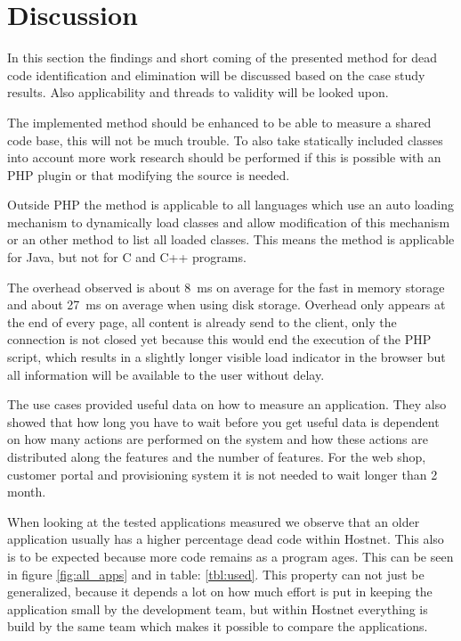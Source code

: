 \section{Discussion}
In this section the findings and short coming of the presented method for dead code identification and elimination will be discussed based on the case study results. Also applicability and threads to validity will be looked upon.

The implemented method should be enhanced to be able to measure a shared code base, this will not be much trouble. To also take statically included classes into account more work research should be performed if this is possible with an PHP plugin or that modifying the source is needed.

Outside PHP the method is applicable to all languages which use an auto loading mechanism to dynamically load classes and allow modification of this mechanism or an other method to list all loaded classes. This means the method is applicable for Java, but not for C and C++ programs.

The overhead observed is about 8~ms on average for the fast in memory storage and about 27~ms on average when using disk storage. Overhead only appears at the end of every page, all content is already send to the client, only the connection is not closed yet because this would end the execution of the PHP script, which results in a slightly longer visible load indicator in the browser but all information will be available to the user without delay.

The use cases provided useful data on how to measure an application. They also showed that how long you have to wait before you get useful data is dependent on how many actions are performed on the system and how these actions are distributed along the features and the number of features. For the web shop, customer portal and provisioning system it is not needed to wait longer than 2 month.

When looking at the tested applications measured we observe that an older application usually has a higher percentage dead code within Hostnet. This also is to be expected because more code remains as a program ages. This can be seen in figure \ref{fig:all_apps} and in table: \ref{tbl:used}. This property can not just be generalized, because it depends a lot on how much effort is put in keeping the application small by the development team\cite{scanniello2011}, but within Hostnet everything is build by the same team which makes it possible to compare the applications.


